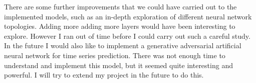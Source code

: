 \documentclass[10pt,a4paper]{article}
\begin{document}
There are some further improvements that we could have carried out to the implemented models, such as an in-depth exploration of different neural network topologies. Adding more adding more layers would have been interesting to explore. However I ran out of time before I could carry out such a careful study. In the future I would also like to implement a generative adversarial artificial neural network for time series prediction. There was not enough time to understand and implement this model, but it seemed quite interesting and powerful. I will try to extend my project in the future to do this.


%
\end{document}
